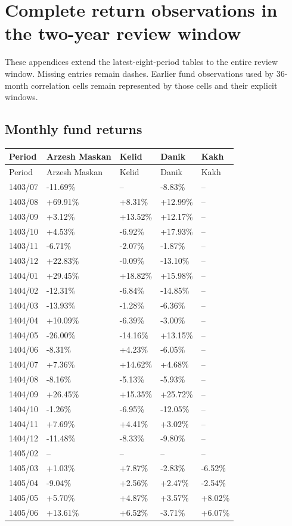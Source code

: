 \documentclass[11pt,a4paper]{article}
\begin{document}
\section{Complete return observations in the two-year review window}

These appendices extend the latest-eight-period tables to the entire review window. Missing entries remain dashes. Earlier fund observations used by 36-month correlation cells remain represented by those cells and their explicit windows.

\subsection{Monthly fund returns}

\begingroup\scriptsize\setlength{\tabcolsep}{3pt}
\begin{longtable}{lllll}
\toprule Period & Arzesh Maskan & Kelid & Danik & Kakh \\ \midrule\endfirsthead
\toprule Period & Arzesh Maskan & Kelid & Danik & Kakh \\ \midrule\endhead
1403/07 & -11.69\% & -- & -8.83\% & -- \\
1403/08 & +69.91\% & +8.31\% & +12.99\% & -- \\
1403/09 & +3.12\% & +13.52\% & +12.17\% & -- \\
1403/10 & +4.53\% & -6.92\% & +17.93\% & -- \\
1403/11 & -6.71\% & -2.07\% & -1.87\% & -- \\
1403/12 & +22.83\% & -0.09\% & -13.10\% & -- \\
1404/01 & +29.45\% & +18.82\% & +15.98\% & -- \\
1404/02 & -12.31\% & -6.84\% & -14.85\% & -- \\
1404/03 & -13.93\% & -1.28\% & -6.36\% & -- \\
1404/04 & +10.09\% & -6.39\% & -3.00\% & -- \\
1404/05 & -26.00\% & -14.16\% & +13.15\% & -- \\
1404/06 & -8.31\% & +4.23\% & -6.05\% & -- \\
1404/07 & +7.36\% & +14.62\% & +4.68\% & -- \\
1404/08 & -8.16\% & -5.13\% & -5.93\% & -- \\
1404/09 & +26.45\% & +15.35\% & +25.72\% & -- \\
1404/10 & -1.26\% & -6.95\% & -12.05\% & -- \\
1404/11 & +7.69\% & +4.41\% & +3.02\% & -- \\
1404/12 & -11.48\% & -8.33\% & -9.80\% & -- \\
1405/02 & -- & -- & -- & -- \\
1405/03 & +1.03\% & +7.87\% & -2.83\% & -6.52\% \\
1405/04 & -9.04\% & +2.56\% & +2.47\% & -2.54\% \\
1405/05 & +5.70\% & +4.87\% & +3.57\% & +8.02\% \\
1405/06 & +13.61\% & +6.52\% & -3.71\% & +6.07\% \\
\bottomrule\end{longtable}\endgroup
\end{document}
